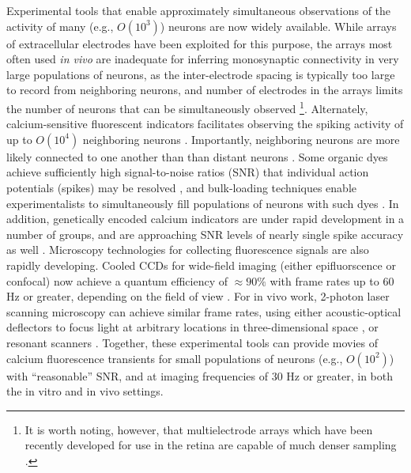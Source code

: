 \documentclass[aoas,preprint]{imsart}
\begin{document}
Experimental tools that enable approximately simultaneous observations of the activity of many (e.g., $O(10^3)$) neurons are now widely available. While arrays of extracellular electrodes have been exploited for this purpose, the arrays most often used \emph{in vivo} are inadequate for inferring monosynaptic connectivity in very large populations of neurons, as the inter-electrode spacing is typically too large to record from neighboring neurons, and number of electrodes in the arrays limits the number of neurons that can be simultaneously observed \cite{HATS98,HARR03,Stein04,Santhanam06,Harris07}\footnote{It is worth noting, however, that multielectrode arrays which have been recently developed for use in the retina are capable of much denser sampling \cite{Berry2004,Litke2004,Petrusca07,PILL07}.}. Alternately, calcium-sensitive fluorescent indicators facilitates observing the spiking activity of up to $O(10^4)$ neighboring neurons \cite{Tsien89,ImagingManual}.  Importantly, neighboring neurons are more likely connected to one another than than distant neurons \cite{Abeles91,Braitenberg1998}. Some organic dyes achieve sufficiently high signal-to-noise ratios (SNR) that individual action potentials (spikes) may be resolved \cite{ImagingManual}, and bulk-loading techniques enable experimentalists to simultaneously fill populations of neurons with such dyes \cite{StosiekKonnerth03}. In addition, genetically encoded calcium indicators are under rapid development in a number of groups, and are approaching SNR levels of nearly single spike accuracy as well \cite{WallaceHasan08}. Microscopy technologies for collecting fluorescence signals are also rapidly developing. Cooled CCDs for wide-field imaging (either epifluorscence or confocal) now achieve a quantum efficiency of $\approx 90 \%$ with frame rates up to $60$ Hz or greater, depending on the field of view \cite{Djurisic04}. For in vivo work, 2-photon laser scanning microscopy can achieve similar frame rates, using either acoustic-optical deflectors to focus light at arbitrary locations in three-dimensional space \cite{ReddySaggau05,Iyer06,SalomeBourdieu06,ReddySaggau08}, or resonant scanners \cite{NguyenParker01}. Together, these experimental tools can provide movies of calcium fluorescence transients for small populations of neurons (e.g., $O(10^2)$) with ``reasonable'' SNR, and at imaging frequencies of $30$ Hz or greater, in both the in vitro and in vivo settings.
\end{document}
